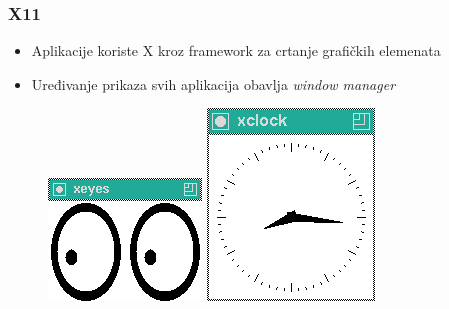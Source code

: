 \documentclass[t,table,usenames,dvipsnames]{beamer}
\begin{document}
\begin{frame}
	\frametitle{X11}
	\begin{itemize}
		\item Aplikacije koriste X kroz framework za crtanje grafičkih elemenata
		\item Uređivanje prikaza svih aplikacija obavlja \emph{window manager}
	\end{itemize}
	
	\begin{figure}[h]
		\begin{minipage}{0.25\textwidth}
			\centering
			\includegraphics[width=\linewidth]{xeyes.png}
		\end{minipage}
		\begin{minipage}{0.25\textwidth}
			\centering
			\includegraphics[width=\linewidth]{xclock.png}

\end{minipage}
\end{figure}
\end{frame}
\end{document}
